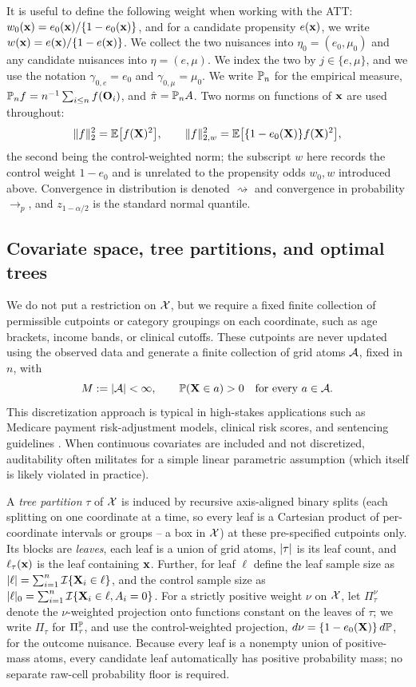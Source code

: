 \documentclass[12pt]{article}
\begin{document}
It is useful to define the following weight when working with the ATT: $w_0(\mathbf{x})=e_0(\mathbf{x})/\{1-e_0(\mathbf{x})\}$, and for a candidate propensity $e(\mathbf{x})$, we write
$w(\mathbf{x})=e(\mathbf{x})/\{1-e(\mathbf{x})\}$. We collect the two nuisances into $\eta_0=(e_0,\mu_0)$ and any candidate nuisances into $\eta=(e,\mu)$. We index the two by $j\in\{e,\mu\}$, and we use the notation $\gamma_{0,e}=e_0$ and $\gamma_{0,\mu}=\mu_0$. We write $\mathbb{P}_n$ for the empirical measure, $\mathbb{P}_n f=n^{-1}\sum_{i\le n}f(\mathbf{O}_i)$, and
$\hat{\pi}=\mathbb{P}_n A$. Two norms on functions of $\mathbf{x}$ are used throughout:
\[
  \|f\|_2^2=\mathbb{E}\bigl[f(\mathbf{X})^2\bigr],
  \qquad
  \|f\|_{2,w}^2=\mathbb{E}\bigl[\{1-e_0(\mathbf{X})\}f(\mathbf{X})^2\bigr],
\]
the second being the control-weighted norm; the subscript $w$ here records
the control weight $1-e_0$ and is unrelated to the propensity odds $w_0,w$
introduced above. Convergence in distribution is denoted $\rightsquigarrow$
and convergence in probability $\to_p$, and $z_{1-\alpha/2}$ is the standard
normal quantile.


\subsection{Covariate space, tree partitions, and optimal trees}\label{sec:trees}

We do not put a restriction on $\mathcal{X}$, but we require a
fixed finite collection of permissible cutpoints or category
groupings on each coordinate, such as age brackets, income bands, or clinical
cutoffs. These cutpoints are never updated using the observed data and generate
a finite collection of grid atoms $\mathcal{A}$, fixed in $n$, with
\[
  M:=\left|\mathcal{A}\right|<\infty,
  \qquad
  \mathbb{P}(\mathbf{X}\in a)>0\quad\text{for every }a\in\mathcal{A}.
\]
This discretization approach is typical in high-stakes applications such as Medicare payment risk-adjustment models, clinical risk scores, and sentencing guidelines \citep{pope2004hcc,wilson1998framingham,breyer1988sentencing}. When continuous covariates are included and not discretized, auditability often militates for a simple linear parametric assumption (which itself is likely violated in practice).

A \emph{tree partition} $\tau$ of $\mathcal{X}$ is induced by recursive axis-aligned
binary splits (each splitting on one coordinate at a time, so every leaf is a
Cartesian product of per-coordinate intervals or groups -- a box in $\mathcal{X}$) at
these pre-specified cutpoints only. Its blocks are
\emph{leaves}, each leaf is a union of grid atoms, $\left|\tau\right|$ is its leaf
count, and $\ell_\tau(\mathbf{x})$ is the leaf containing $\mathbf{x}$. Further, for leaf $\ell$ define the leaf sample size as $|\ell| = \sum_{i=1}^n \mathcal{I}\{\mathbf{X}_i \in \ell\}$, and the control sample size as $|\ell|_0 = \sum_{i=1}^n \mathcal{I}\{\mathbf{X}_i \in \ell, A_i = 0\}$. For a strictly positive weight $\nu$ on $\mathcal{X}$, let $\Pi^\nu_\tau$ denote the $\nu$-weighted projection onto functions constant on the leaves of $\tau$; we write $\Pi_\tau$ for $\Pi^{\mathbb{P}}_\tau$, and use the control-weighted projection, $d\nu=\{1-e_0(\mathbf{X})\}\,d\mathbb{P}$, for the outcome nuisance. Because every leaf is a nonempty union of positive-mass atoms, every candidate leaf automatically has positive probability mass; no separate raw-cell probability floor is required.
\end{document}
